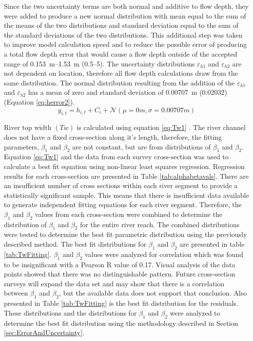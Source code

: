 \begin{linenumbers}
Since the two uncertainty terms are both normal and additive to flow depth, they were added to produce a new normal distribution with mean equal to the sum of the means of the two distributions and standard deviation equal to the sum of the standard deviations of the two distributions.  This additional step was taken to improve model calculation speed and to reduce the possible error of producing a total flow depth error that would cause a flow depth outside of the accepted range of \SIrange{0.153}{1.53}{\meter} (\SIrange{0.5}{5}{\foot}).  The uncertainty distributions $ \varepsilon_{h1} $ and $ \varepsilon_{h2} $ are not dependent on location, therefore all flow depth calculations draw from the same distribution.  The normal distribution resulting from the addition of the $ \varepsilon_{h1} $ and $ \varepsilon_{h2} $ has a mean of zero and standard deviation of \SI{0.00707}{\meter} (\SI{0.02032}{\foot}) (Equation \ref{eq:herror2}).  
\begin{equation}
	y_{i,t}=h_{i,t}+C_{i}+\mathcal{N} \left( \mu=0m, \sigma=0.00707m \right)
	\label{eq:herror2}
\end{equation}

River top width $ \left( Tw \right)  $ is calculated using equation \ref{eq:Tw1}  \parencite{Buhman2002,Gates1996}. The river channel does not have a fixed cross-section along it's length, therefore, the fitting parameters, $ \beta_1 $ and $ \beta_2 $ are not constant, but are from distributions of  $ \beta_1 $ and $ \beta_2 $.  Equation \ref{eq:Tw1} and the data from each survey cross-section was used to calculate a best fit equation using non-linear least squares regression.  Regression results for each cross-section are presented in Table \ref{tab:alphabetavals}.  There are an insufficient number of cross sections within each river segment to provide a statistically significant sample.  This means that there is insufficient data available to generate independent fitting equations for each river segment.  Therefore, the $ \beta_1 $ and $ \beta_2 $ values from each cross-section were combined to determine the distribution of $ \beta_1 $ and $ \beta_2 $ for the entire river reach.  The combined distributions were tested to determine the best fit parametric distribution using the previously described method.  The best fit distributions for $ \beta_1 $ and $ \beta_2 $ are presented in table \ref{tab:TwFitting}.  $ \beta_1 $ and $ \beta_2 $ values were analyzed for correlation which was found to be insignificant with a Pearson R value of 0.17.  Visual analysis of the data points showed that there was no distinguishable pattern.  Future cross-section surveys will expand the data set and may show that there is a correlation between $ \beta_1 $ and $ \beta_2 $, but the available data does not support that conclusion.  Also presented in Table \ref{tab:TwFitting} is the best fit distribution for the residuals.  These distributions and the distributions for $ \beta_1 $ and $ \beta_2 $ were analyzed to determine the best fit distribution using the methodology described in Section \ref{sec:ErrorAndUncertainty}.


\end{linenumbers}
